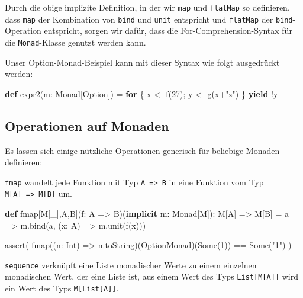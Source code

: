 \documentclass[]{article}
\newenvironment{Shaded}{}{}
\newcommand{\DecValTok}[1]{\textcolor[rgb]{0.25,0.63,0.44}{#1}}
\newcommand{\FunctionTok}[1]{\textcolor[rgb]{0.02,0.16,0.49}{#1}}
\newcommand{\KeywordTok}[1]{\textcolor[rgb]{0.00,0.44,0.13}{\textbf{#1}}}
\newcommand{\NormalTok}[1]{#1}
\newcommand{\StringTok}[1]{\textcolor[rgb]{0.25,0.44,0.63}{#1}}
\begin{document}
Durch die obige implizite Definition, in der wir \texttt{map} und
\texttt{flatMap} so definieren, dass \texttt{map} der Kombination von
\texttt{bind} und \texttt{unit} entspricht und \texttt{flatMap} der
\texttt{bind}-Operation entspricht, sorgen wir dafür, dass die
For-Comprehension-Syntax für die \texttt{Monad}-Klasse genutzt werden
kann.

Unser Option-Monad-Beispiel kann mit dieser Syntax wie folgt ausgedrückt
werden:

\begin{Shaded}
\begin{Highlighting}[]
\KeywordTok{def} \FunctionTok{expr2}\NormalTok{(m: Monad[Option]) = }\KeywordTok{for}\NormalTok{ \{}
\NormalTok{  x \textless{}{-} }\FunctionTok{f}\NormalTok{(}\DecValTok{27}\NormalTok{);}
\NormalTok{  y \textless{}{-} }\FunctionTok{g}\NormalTok{(x+}\StringTok{"z"}\NormalTok{) }
\NormalTok{\} }\KeywordTok{yield}\NormalTok{ !y}
\end{Highlighting}
\end{Shaded}

\hypertarget{operationen-auf-monaden}{%
\subsection{Operationen auf Monaden}\label{operationen-auf-monaden}}

Es lassen sich einige nützliche Operationen generisch für beliebige
Monaden definieren:

\texttt{fmap} wandelt jede Funktion mit Typ
\texttt{A\ =\textgreater{}\ B} in eine Funktion vom Typ
\texttt{M{[}A{]}\ =\textgreater{}\ M{[}B{]}} um.

\begin{Shaded}
\begin{Highlighting}[]
\KeywordTok{def}\NormalTok{ fmap[M[\_],A,B](f: A =\textgreater{} B)(}\KeywordTok{implicit}\NormalTok{ m: Monad[M]): M[A] =\textgreater{} M[B] = }
\NormalTok{  a =\textgreater{} m.}\FunctionTok{bind}\NormalTok{(a, (x: A) =\textgreater{} m.}\FunctionTok{unit}\NormalTok{(}\FunctionTok{f}\NormalTok{(x)))}

\FunctionTok{assert}\NormalTok{( }\FunctionTok{fmap}\NormalTok{((n: Int) =\textgreater{} n.}\FunctionTok{toString}\NormalTok{)(OptionMonad)(Some(}\DecValTok{1}\NormalTok{)) == Some(}\StringTok{"1"}\NormalTok{) )}
\end{Highlighting}
\end{Shaded}

\texttt{sequence} verknüpft eine Liste monadischer Werte zu einem
einzelnen monadischen Wert, der eine Liste ist, aus einem Wert des Typs
\texttt{List{[}M{[}A{]}{]}} wird ein Wert des Typs
\texttt{M{[}List{[}A{]}{]}}.
\end{document}

